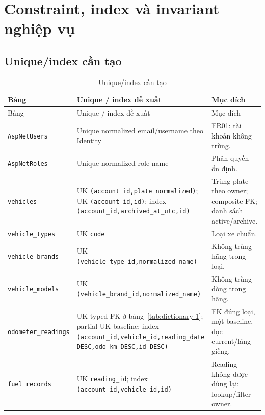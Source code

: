 \section{Constraint, index và invariant nghiệp vụ}
\subsection{Unique/index cần tạo}
\begin{smalltable}\begin{longtable}{L{3.0cm}L{3.2cm}L{8.2cm}}
\caption{Unique/index cần tạo}\label{tab:dictionary-14}\\\toprule
Bảng & Unique / index đề xuất & Mục đích\\\midrule\endfirsthead
\toprule Bảng & Unique / index đề xuất & Mục đích\\\midrule\endhead
\texttt{AspNetUsers} & Unique normalized email/username theo Identity & FR01: tài khoản không trùng.\\
\texttt{AspNetRoles} & Unique normalized role name & Phân quyền ổn định.\\
\texttt{vehicles} & UK \texttt{(account\_\allowbreak{}id,\allowbreak{}plate\_\allowbreak{}normalized)}; UK \texttt{(account\_\allowbreak{}id,\allowbreak{}id)}; index \texttt{(account\_\allowbreak{}id,\allowbreak{}archived\_\allowbreak{}at\_\allowbreak{}utc,\allowbreak{}id)} & Trùng plate theo owner; composite FK; danh sách active/archive.\\
\texttt{vehicle\_\allowbreak{}types} & UK \texttt{code} & Loại xe chuẩn.\\
\texttt{vehicle\_\allowbreak{}brands} & UK \texttt{(vehicle\_\allowbreak{}type\_\allowbreak{}id,\allowbreak{}normalized\_\allowbreak{}name)} & Không trùng hãng trong loại.\\
\texttt{vehicle\_\allowbreak{}models} & UK \texttt{(vehicle\_\allowbreak{}brand\_\allowbreak{}id,\allowbreak{}normalized\_\allowbreak{}name)} & Không trùng dòng trong hãng.\\
\texttt{odometer\_\allowbreak{}readings} & UK typed FK ở bảng~\ref{tab:dictionary-1}; partial UK baseline; index \texttt{(account\_\allowbreak{}id,\allowbreak{}vehicle\_\allowbreak{}id,\allowbreak{}reading\_\allowbreak{}date DESC,\allowbreak{}odo\_\allowbreak{}km DESC,\allowbreak{}id DESC)} & FK đúng loại, một baseline, đọc current/láng giềng.\\
\texttt{fuel\_\allowbreak{}records} & UK \texttt{reading\_\allowbreak{}id}; index \texttt{(account\_\allowbreak{}id,\allowbreak{}vehicle\_\allowbreak{}id,\allowbreak{}id)} & Reading không được dùng lại; lookup/filter owner.\\

\end{longtable}
\end{smalltable}
